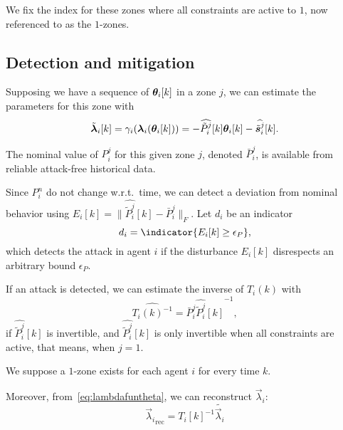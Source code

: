 \documentclass{ifacconf}  %
\begin{document}
We fix the index for these zones where all constraints are active to $1$, now referenced to as the $1$-zones.

\subsection{Detection and mitigation}\label{ssec:DM}
Supposing we have a sequence of $\thetaik$ in a zone $j$, we can estimate the parameters for this zone with
\begin{equation}
  \label{eq:lambdafuntheta_tilde}
\lambdaicheat[k]=\gamma_{i}(\lambdai(\thetaik))=-\widehat{\tilde{P}_{i}^{j}}[k]\thetaik-\widehat{\tilde{\vec{s}}_{i}^{j}}[k].
\end{equation}

\begin{assumption}\label{ass:Pnominal}
  The nominal value of $P_{i}^{j}$ for this given zone $j$, denoted $\bar{P}_{i}^{j}$, is available from reliable attack-free historical data.
\end{assumption}

Since $P_{i}^{n}$ do not change w.r.t.\ time, we can detect a deviation from nominal behavior using ${E_{i}[k] =\|\widehat{\tilde{P}_{i}^{j}}[k]-\bar{P}_{i}^{j}\|_{F}}$.
Let ${d_{i}}$ be an indicator
\begin{equation}
  \label{eq:2}
  d_{i}=\indicator{E_{i}[k]\geq\epsilon_{P}},
\end{equation}
which detects the attack in agent $i$
if the disturbance $E_{i}[k]$ disrespects an arbitrary bound $\epsilon_{P}$.

If an attack is detected, we can estimate the inverse of $T_{i}(k)$ with
\begin{equation}
\widehat{{T_{i}(k)}^{-1}}=\bar{P}_{i}^{j}{\widehat{\tilde{P}_{i}^{j}}[k]}^{-1},
\end{equation}
if $\widehat{\tilde{P}_{i}^{j}}[k]$ is invertible, and $\widehat{\tilde{P}_{i}^{j}}[k]$ is only invertible when all constraints are active, that means, when ${j=1}$.
\begin{assumption}
  We suppose a $1$-zone exists for each agent $i$ for every time $k$.
\end{assumption}
Moreover, from~\eqref{eq:lambdafuntheta}, we can reconstruct $\vec{\lambda}_{i}$:
\begin{equation}
  \label{eq:lambda_reconstruction}
  {\vec{\lambda}_{i}}_{\mathrm{rec}}=\widehat{{T_{i}[k]}^{-1}} \tilde{\vec{\lambda}_{i}}
\end{equation}
\end{document}
